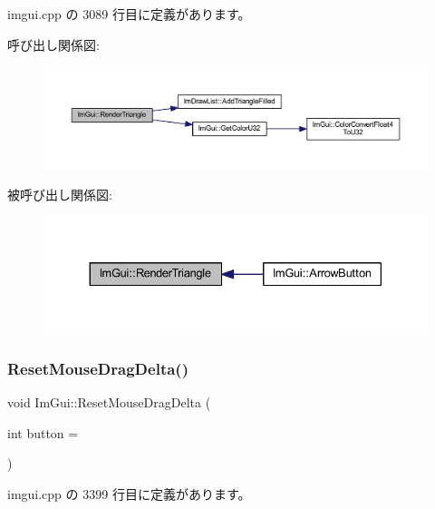  imgui.\+cpp の 3089 行目に定義があります。

呼び出し関係図\+:\nopagebreak
\begin{figure}[H]
\begin{center}
\leavevmode
\includegraphics[width=350pt]{namespace_im_gui_ad11a82904a65722d285230567af826b8_cgraph}
\end{center}
\end{figure}
被呼び出し関係図\+:\nopagebreak
\begin{figure}[H]
\begin{center}
\leavevmode
\includegraphics[width=330pt]{namespace_im_gui_ad11a82904a65722d285230567af826b8_icgraph}
\end{center}
\end{figure}
\mbox{\label{namespace_im_gui_aa03f31a184cafdf506feb2e8ba07f91e}} 
\subsubsection{\texorpdfstring{Reset\+Mouse\+Drag\+Delta()}{ResetMouseDragDelta()}}
{\footnotesize\ttfamily void Im\+Gui\+::\+Reset\+Mouse\+Drag\+Delta (\begin{DoxyParamCaption}\item[{int}]{button = {} }\end{DoxyParamCaption})}



 imgui.\+cpp の 3399 行目に定義があります。

\mbox{\label{namespace_im_gui_ab1826c569a8f3296b9723a2148013d28}} 
